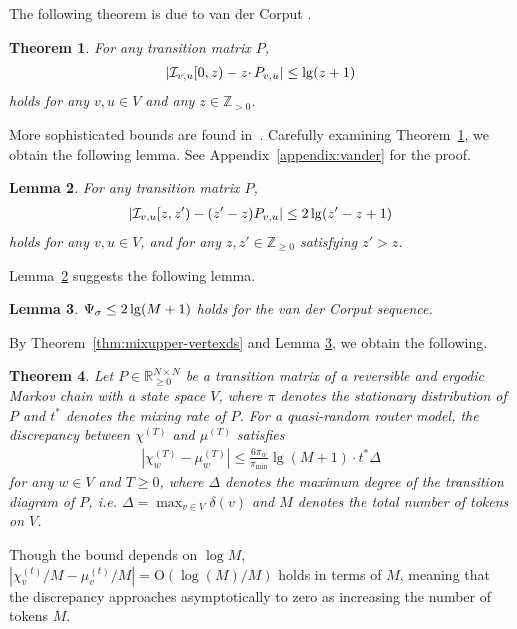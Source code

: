 \documentclass[letter, 11pt]{article}
\newcommand{\Order}{\mathrm{O}}
\newcommand{\1}{\mbox{1}\hspace{-0.25em}\mbox{l}}
\newcommand{\I}{{\cal I}} \newcommand{\C}{{\cal C}} \newcommand{\dtv}{{\cal D}_{\rm tv}}
\newtheorem{theorem}{Theorem}[section]
\newtheorem{lemma}[theorem]{Lemma}
\begin{document}
The following theorem is due to van der Corput \cite{JGV35}. 
\begin{theorem}\label{thm:upper-logM}\cite{JGV35}
 For any transition matrix $P$, 
\begin{eqnarray*}
 \left|\I_{v, u}[0, z) - z\cdotp P_{v, u}\right| 
 \leq \lg(z+1)
\end{eqnarray*}
 holds for any $v, u\in V$ and any $z \in \mathbb{Z}_{> 0}$. 
\end{theorem}
More sophisticated bounds are found in~\cite{N78}. 
Carefully examining Theorem~\ref{thm:upper-logM}, 
  we obtain the following lemma. 
  See Appendix~\ref{appendix:vander} for the proof. 
\begin{lemma}\label{bound:vandercz}
For any transition matrix $P$, 
\begin{eqnarray*}
\left| \I_{v, u}[z, z')-(z'-z)P_{v, u}\right|\leq 2\lg(z'-z+1)
\end{eqnarray*}
 holds for any $v, u\in V$, and for any $z, z'\in \mathbb{Z}_{\geq 0}$ satisfying $z'>z$. 
\end{lemma}
Lemma~\ref{bound:vandercz} suggests the following lemma. 
\begin{lemma}\label{bound:vanderc}
$\Psi_\sigma \leq 2\lg(M+1)$ holds for the van der Corput sequence. 
\end{lemma}

By Theorem~\ref{thm:mixupper-vertexds} and Lemma \ref{bound:vanderc}, we obtain the following. 

\begin{theorem}
\label{thm:mixupper-vertexvc}
 Let $P \in \mathbb{R}_{\geq 0}^{N \times N}$ be a transition matrix of 
  a reversible and ergodic Markov chain with a state space $V$, where $\pi$ denotes the stationary distribution of $P$ and $t^*$ denotes the mixing rate of $P$. 
  For a quasi-random router model, the discrepancy between $\chi^{(T)}$ and $\mu^{(T)}$ satisfies
\begin{eqnarray*}
\left|\chi_w^{(T)}-\mu_w^{(T)}\right|
\leq \frac{6\pi_w}{\pi_{\min}} \lg(M+1) \cdotp t^* \Delta
\end{eqnarray*}
for any $w\in V$ and $T\geq 0$, where $\Delta$ denotes the maximum degree of the transition diagram of $P$, {\rm i.e.} $\Delta=\max_{v\in V}\delta(v)$ and $M$ denotes the total number of tokens on $V$. 
\end{theorem}
Though the bound depends on $\log M$,  
   $|\chi^{(t)}_v/M - \mu^{(t)}_v/M| = \Order(\log(M)/ M)$ holds in terms of $M$, 
   meaning that the discrepancy approaches asymptotically to zero 
     as increasing the number of tokens $M$. 
\end{document}
